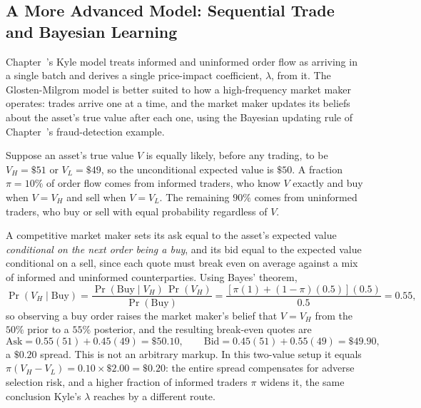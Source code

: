 \documentclass[../ai_in_finance]{subfiles}
\begin{document}
\subsection{A More Advanced Model: Sequential Trade and Bayesian Learning}
\label{sec:glosten-milgrom}

Chapter~'s Kyle model treats informed and uninformed order flow as arriving in a single batch and derives a single price-impact coefficient, $\lambda$, from it. The Glosten-Milgrom model is better suited to how a high-frequency market maker operates: trades arrive one at a time, and the market maker updates its beliefs about the asset's true value after each one, using the Bayesian updating rule of Chapter~'s fraud-detection example.

Suppose an asset's true value $V$ is equally likely, before any trading, to be $V_H=\$51$ or $V_L=\$49$, so the unconditional expected value is $\$50$. A fraction $\pi=10\%$ of order flow comes from informed traders, who know $V$ exactly and buy when $V=V_H$ and sell when $V=V_L$. The remaining $90\%$ comes from uninformed traders, who buy or sell with equal probability regardless of $V$.

A competitive market maker sets its ask equal to the asset's expected value \emph{conditional on the next order being a buy}, and its bid equal to the expected value conditional on a sell, since each quote must break even on average against a mix of informed and uninformed counterparties. Using Bayes' theorem,
\begin{equation}
\Pr(V_H \mid \text{Buy}) = \frac{\Pr(\text{Buy}\mid V_H)\,\Pr(V_H)}{\Pr(\text{Buy})} = \frac{[\pi(1)+(1-\pi)(0.5)](0.5)}{0.5} = 0.55,
\label{eq:hft-gm-posterior}
\end{equation}
so observing a buy order raises the market maker's belief that $V=V_H$ from the $50\%$ prior to a $55\%$ posterior, and the resulting break-even quotes are
\begin{equation*}
\text{Ask} = 0.55(51) + 0.45(49) = \$50.10, \qquad \text{Bid} = 0.45(51) + 0.55(49) = \$49.90,
\end{equation*}
a $\$0.20$ spread. This is not an arbitrary markup. In this two-value setup it equals $\pi(V_H-V_L) = 0.10 \times \$2.00 = \$0.20$: the entire spread compensates for adverse selection risk, and a higher fraction of informed traders $\pi$ widens it, the same conclusion Kyle's $\lambda$ reaches by a different route.
\end{document}
